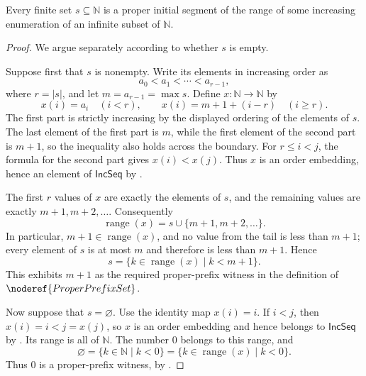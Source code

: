 \begin{lemma}
Every finite set $s\subseteq\mathbb N$ is a proper initial segment of the
range of some increasing enumeration of an infinite subset of $\mathbb N$.
\end{lemma}
\begin{proof}
We argue separately according to whether $s$ is empty.

Suppose first that $s$ is nonempty.  Write its elements in increasing order
as
\[
a_0<a_1<\cdots<a_{r-1},
\]
where $r=|s|$, and let $m=a_{r-1}=\max s$.  Define $x:\mathbb N\to\mathbb
N$ by
\[
x(i)=a_i\quad (i<r),
\qquad
x(i)=m+1+(i-r)\quad (i\ge r).
\]
The first part is strictly increasing by the displayed ordering of the
elements of $s$.  The last element of the first part is $m$, while the first
element of the second part is $m+1$, so the inequality also holds across the
boundary.  For $r\le i<j$, the formula for the second part gives
$x(i)<x(j)$.  Thus $x$ is an order embedding, hence an element of
$\mathsf{IncSeq}$ by .

The first $r$ values of $x$ are exactly the elements of $s$, and the
remaining values are exactly $m+1,m+2,\ldots$.  Consequently
\[
\operatorname{range}(x)=s\cup\{m+1,m+2,\ldots\}.
\]
In particular, $m+1\in\operatorname{range}(x)$, and no value from the tail is
less than $m+1$; every element of $s$ is at most $m$ and therefore is less
than $m+1$.  Hence
\[
s=\{k\in\operatorname{range}(x)\mid k<m+1\}.
\]
This exhibits $m+1$ as the required proper-prefix witness in the definition
of $\noderef{ProperPrefixSet}$.

Now suppose that $s=\varnothing$.  Use the identity map $x(i)=i$.  If
$i<j$, then $x(i)=i<j=x(j)$, so $x$ is an order embedding and hence belongs
to $\mathsf{IncSeq}$ by .  Its range is all of $\mathbb N$.
The number $0$ belongs to this range, and
\[
\varnothing=\{k\in\mathbb N\mid k<0\}
       =\{k\in\operatorname{range}(x)\mid k<0\}.
\]
Thus $0$ is a proper-prefix witness, by .
\end{proof}
